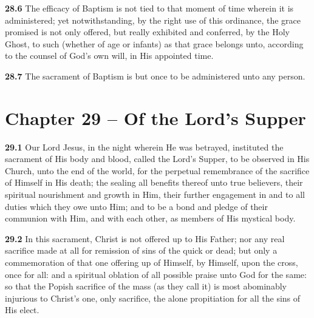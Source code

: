 \par\textbf{28.6} The efficacy of Baptism is not tied to that moment of time wherein it is administered; yet notwithstanding, by the right use of this ordinance, the grace promised is not only offered, but really exhibited and conferred, by the Holy Ghost, to such (whether of age or infants) as that grace belongs unto, according to the counsel of God's own will, in His appointed time.   

\par\textbf{28.7} The sacrament of Baptism is but once to be administered unto any person.  

\section{Chapter 29 -- Of the Lord's Supper}

\par\textbf{29.1} Our Lord Jesus, in the night wherein He was betrayed, instituted the sacrament of His body and blood, called the Lord's Supper, to be observed in His Church, unto the end of the world, for the perpetual remembrance of the sacrifice of Himself in His death; the sealing all benefits thereof unto true believers, their spiritual nourishment and growth in Him, their further engagement in and to all duties which they owe unto Him; and to be a bond and pledge of their communion with Him, and with each other, as members of His mystical body.   

\par\textbf{29.2} In this sacrament, Christ is not offered up to His Father; nor any real sacrifice made at all for remission of sins of the quick or dead; but only a commemoration of that one offering up of Himself, by Himself, upon the cross, once for all: and a spiritual oblation of all possible praise unto God for the same: so that the Popish sacrifice of the mass (as they call it) is most abominably injurious to Christ's one, only sacrifice, the alone propitiation for all the sins of His elect.   

